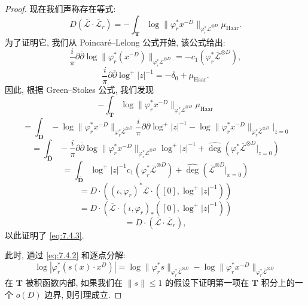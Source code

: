 \begin{proof}
现在我们声称存在等式:
\begin{equation}\label{eq:7.4.3}
D(\overline{\mathcal{L}} \cdot \overline{\mathcal{L}}_r) = -\int_{\mathbf{T}} \log \|\varphi_r^* x^{-D}\|_{\varphi_r^* \overline{\mathcal{L}}^{\otimes D}} \mu_{\text{Haar}}.
\end{equation}
为了证明它, 我们从 Poincaré--Lelong 公式开始, 该公式给出:
\[ \frac{i}{\pi} \partial \overline{\partial} \log \|\varphi_r^*(x^{-D})\|_{\varphi_r^* \overline{\mathcal{L}}^{\otimes D}} = -c_1 \left( \varphi_r^* \overline{\mathcal{L}}^{\otimes D} \right), \]
\[ \frac{i}{\pi} \partial \overline{\partial} \log^+ |z|^{-1} = -\delta_0 + \mu_{\text{Haar}}. \]
因此, 根据 Green--Stokes 公式, 我们发现
\[ -\int_{\mathbf{T}} \log \|\varphi_{r}^{*}x^{-D}\|_{\varphi_{r}^{*}\overline{\mathcal{L}}^{\otimes D}} \mu_{\text{Haar}} \]
\[ = \int_{\overline{\mathbf{D}}} -\log \|\varphi_{r}^{*}x^{-D}\|_{\varphi_{r}^{*}\overline{\mathcal{L}}^{\otimes D}} \frac{i}{\pi} \partial \overline{\partial} \log^{+} |z|^{-1} -\log \|\varphi_{r}^{*}x^{-D}\|_{\varphi_{r}^{*}\overline{\mathcal{L}}^{\otimes D}}\Big|_{z=0} \]
\[ = \int_{\overline{\mathbf{D}}} -\frac{i}{\pi} \partial \overline{\partial} \log \|\varphi_{r}^{*}x^{-D}\|_{\varphi_{r}^{*}\overline{\mathcal{L}}^{\otimes D}} \log^{+} |z|^{-1} + \widehat{\operatorname{deg}} \left(\varphi_{r}^{*}\overline{\mathcal{L}}^{\otimes D}\Big|_{z=0}\right) \]
\[ = \int_{\overline{\mathbf{D}}} \log^{+} |z|^{-1} c_{1}(\varphi_{r}^{*}\overline{\mathcal{L}}^{\otimes D}) + \widehat{\operatorname{deg}} \left(\overline{\mathcal{L}}^{\otimes D}\Big|_{x=0}\right) \]
\[ = D \cdot \left((\iota, \varphi_{r})^{*}\overline{\mathcal{L}} \cdot ([0], \log^{+} |z|^{-1})\right) \]
\[ = D \cdot \left(\overline{\mathcal{L}} \cdot (\iota, \varphi_{r})_{*}([0], \log^{+} |z|^{-1})\right) \]
\[ = D \cdot \left(\overline{\mathcal{L}} \cdot \overline{\mathcal{L}}_{r}\right), \]
以此证明了 \eqref{eq:7.4.3}.

此时, 通过 \eqref{eq:7.4.2} 和逐点分解:
\begin{equation}\label{eq:7.4.4}
\log |\varphi_r^*(s(x) \cdot x^D)| = \log \|\varphi_r^* s\|_{\varphi_r^* \overline{\mathcal{L}}^{\otimes D}} - \log \|\varphi_r^* x^{-D}\|_{\varphi_r^* \overline{\mathcal{L}}^{\otimes D}}
\end{equation}
在 \(\mathbf{T}\) 被积函数内部, 如果我们在 \(\|s\| \le 1\) 的假设下证明第一项在 \(\mathbf{T}\) 积分上的一个 \(o(D)\) 边界, 则引理成立.


\end{proof}
